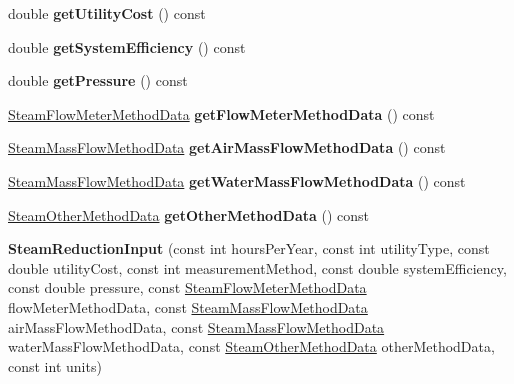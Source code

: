 \begin{DoxyCompactItemize}
double {\bfseries get\+Utility\+Cost} () const
\item 
\mbox{\label{class_steam_reduction_input_a818bc57bd61a00a4991d7929045d826a}} 
double {\bfseries get\+System\+Efficiency} () const
\item 
\mbox{\label{class_steam_reduction_input_ab02ca5d6f81ba93c8b0e6b9ad134dbca}} 
double {\bfseries get\+Pressure} () const
\item 
\mbox{\label{class_steam_reduction_input_ac830ce35244e62bdf57a2179ad8ef6c6}} 
\hyperlink{class_steam_flow_meter_method_data}{Steam\+Flow\+Meter\+Method\+Data} {\bfseries get\+Flow\+Meter\+Method\+Data} () const
\item 
\mbox{\label{class_steam_reduction_input_afb59841b5666f33eae95ccea483aea1d}} 
\hyperlink{class_steam_mass_flow_method_data}{Steam\+Mass\+Flow\+Method\+Data} {\bfseries get\+Air\+Mass\+Flow\+Method\+Data} () const
\item 
\mbox{\label{class_steam_reduction_input_a81d1df7d17bcac53c277d371fd0396e1}} 
\hyperlink{class_steam_mass_flow_method_data}{Steam\+Mass\+Flow\+Method\+Data} {\bfseries get\+Water\+Mass\+Flow\+Method\+Data} () const
\item 
\mbox{\label{class_steam_reduction_input_a0975aab8faf50599028f150c184c9699}} 
\hyperlink{class_steam_other_method_data}{Steam\+Other\+Method\+Data} {\bfseries get\+Other\+Method\+Data} () const
\item 
\mbox{\label{class_steam_reduction_input_a1e5233ae23531bfd3573f1dbcec7e3f1}} 
{\bfseries Steam\+Reduction\+Input} (const int hours\+Per\+Year, const int utility\+Type, const double utility\+Cost, const int measurement\+Method, const double system\+Efficiency, const double pressure, const \hyperlink{class_steam_flow_meter_method_data}{Steam\+Flow\+Meter\+Method\+Data} flow\+Meter\+Method\+Data, const \hyperlink{class_steam_mass_flow_method_data}{Steam\+Mass\+Flow\+Method\+Data} air\+Mass\+Flow\+Method\+Data, const \hyperlink{class_steam_mass_flow_method_data}{Steam\+Mass\+Flow\+Method\+Data} water\+Mass\+Flow\+Method\+Data, const \hyperlink{class_steam_other_method_data}{Steam\+Other\+Method\+Data} other\+Method\+Data, const int units)

\end{DoxyCompactItemize}
